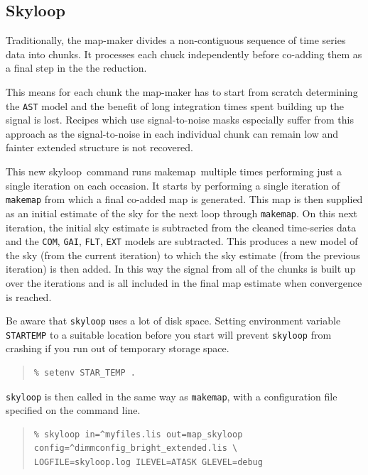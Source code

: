 \documentclass[twoside,11pt]{article}
\newcommand{\xref}[3]{#1}
\newcommand{\xlabel}[1]{}
\renewcommand{\_}{\texttt{\symbol{95}}}
\newenvironment{myquote}{\begin{quote}\begin{small}}{\end{small}\end{quote}}
\newcommand{\task}[1]{\textsf{#1}}
\newcommand{\makemap}{\xref{\task{makemap}}{sun258}{MAKEMAP}}
\newcommand{\skyloop}{\xref{\task{skyloop}}{sun258}{SKYLOOP}}
\begin{document}
\subsection{\xlabel{skyloop}Skyloop}
\label{sec:skyloop}

Traditionally, the map-maker divides a non-contiguous sequence of time
series data into chunks. It processes each chuck independently
before co-adding them as a final step in the the reduction.

This means for each chunk the map-maker has to start from scratch
determining the \texttt{AST} model and the benefit of long integration
times spent building up the signal is lost. Recipes which use
signal-to-noise masks especially suffer from this approach as the
signal-to-noise in each individual chunk can remain low and fainter
extended structure is not recovered.

This new \skyloop\ command runs \makemap\ multiple times
performing just a single iteration on each occasion. It starts by
performing a single iteration of \texttt{makemap} from which a final
co-added map is generated. This map is then supplied as an initial
estimate of the sky for the next loop through \texttt{makemap}. On
this next iteration, the initial sky estimate is subtracted from the
cleaned time-series data and the \texttt{COM}, \texttt{GAI},
\texttt{FLT}, \texttt{EXT} models are subtracted. This produces a new
model of the sky (from the current iteration) to which the sky
estimate (from the previous iteration) is then added. In this way the
signal from all of the chunks is built up over the iterations and is
all included in the final map estimate when convergence is reached.

Be aware that \texttt{skyloop} uses a lot of disk space. Setting
environment variable \texttt{STAR\_TEMP} to a suitable location
before you start will prevent \texttt{skyloop} from crashing
if you run out of temporary storage space.
\begin{myquote}
\begin{verbatim}
% setenv STAR_TEMP .
\end{verbatim}
\end{myquote}
 \texttt{skyloop} is then called in the same way as \texttt{makemap}, with
 a configuration file specified on the command line.
\begin{myquote}
\begin{verbatim}
% skyloop in=^myfiles.lis out=map_skyloop config=^dimmconfig_bright_extended.lis \
LOGFILE=skyloop.log ILEVEL=ATASK GLEVEL=debug
\end{verbatim}
\end{myquote}
\end{document}
